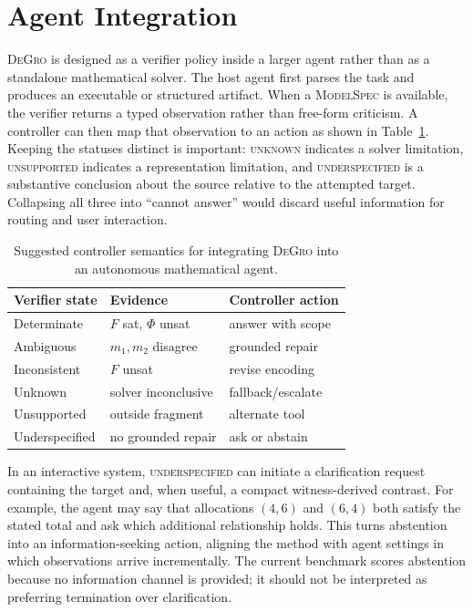 \documentclass[sigconf,anonymous]{aamas}
\newcommand{\method}{\textsc{DeGro}}
\begin{document}
\section{Agent Integration}
\method{} is designed as a verifier policy inside a larger agent rather than as a standalone mathematical solver.  The host agent first parses the task and produces an executable or structured artifact.  When a \textsc{ModelSpec} is available, the verifier returns a typed observation rather than free-form criticism.  A controller can then map that observation to an action as shown in Table~\ref{tab:policy}.  Keeping the statuses distinct is important: \textsc{unknown} indicates a solver limitation, \textsc{unsupported} indicates a representation limitation, and \textsc{underspecified} is a substantive conclusion about the source relative to the attempted target.  Collapsing all three into ``cannot answer'' would discard useful information for routing and user interaction.

\begin{table}[t]
\centering
\caption{Suggested controller semantics for integrating \method{} into an autonomous mathematical agent.}
\label{tab:policy}
\small
\begin{tabular}{lll}
\toprule
Verifier state & Evidence & Controller action\\
\midrule
Determinate & $F$ sat, $\Phi$ unsat & answer with scope\\
Ambiguous & $m_1,m_2$ disagree & grounded repair\\
Inconsistent & $F$ unsat & revise encoding\\
Unknown & solver inconclusive & fallback/escalate\\
Unsupported & outside fragment & alternate tool\\
Underspecified & no grounded repair & ask or abstain\\
\bottomrule
\end{tabular}
\end{table}

In an interactive system, \textsc{underspecified} can initiate a clarification request containing the target and, when useful, a compact witness-derived contrast.  For example, the agent may say that allocations $(4,6)$ and $(6,4)$ both satisfy the stated total and ask which additional relationship holds.  This turns abstention into an information-seeking action, aligning the method with agent settings in which observations arrive incrementally.  The current benchmark scores abstention because no information channel is provided; it should not be interpreted as preferring termination over clarification.
\end{document}
